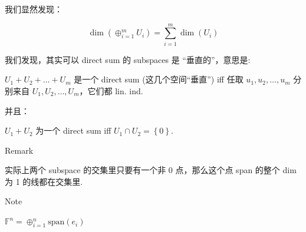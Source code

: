 我们显然发现：

\begin{proposition}

\[\dim\left( {\oplus_{i = 1}^{m}U_{i}} \right) = \sum\limits_{i = 1}^{m}\dim\left( U_{i} \right)\]

\end{proposition}

我们发现，其实可以 direct sum 的 subspaces 是 ``垂直的''，意思是:

\begin{theorem}

\(U_{1} + U_{2} + \ldots + U_{m}\) 是一个 direct sum (这几个空间``垂直'') iff 任取 \(u_{1},u_{2},\ldots,u_{m}\) 分别来自 \(U_{1},U_{2},\ldots,U_{m}\)，它们都 lin. ind.

\end{theorem}

并且：

\begin{theorem}

\(U_{1} + U_{2}\) 为一个 direct sum iff \(U_{1} \cap U_{2} = \left\{ 0 \right\}\).

\end{theorem}

\begin{qlremark}{Remark}

实际上两个 subspace 的交集里只要有一个非 0 点，那么这个点 span 的整个 dim 为 1 的线都在交集里.

\end{qlremark}

\begin{qlnote}{Note}

\(\mathbb{F}^{n} = \oplus_{i = 1}^{n}\text{span}\left( e_{i} \right)\)

\end{qlnote}
